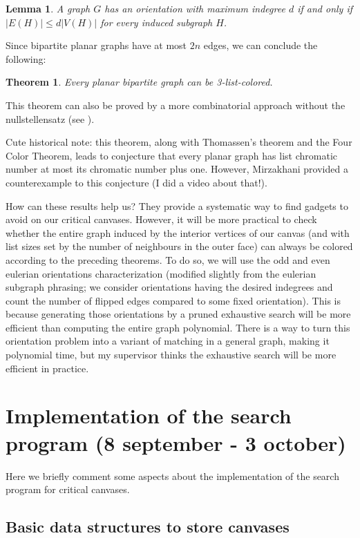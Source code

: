 \documentclass{article}
\newtheorem{theorem}{Theorem}
\newtheorem{lemma}{Lemma}
\begin{document}
\begin{lemma}
A graph $G$ has an orientation with maximum indegree $d$ if and only if $|E(H)| \leq d|V(H)|$ for every induced subgraph $H$.
\end{lemma}

Since bipartite planar graphs have at most $2n$ edges, we can conclude the following:

\begin{theorem}
Every planar bipartite graph can be 3-list-colored.
\end{theorem}

This theorem can also be proved by a more combinatorial approach without the nullstellensatz (see \cite{dvoraknullstellensatz}). 

Cute historical note: this theorem, along with Thomassen's theorem and the Four Color Theorem, leads to conjecture that every planar graph has list chromatic number at most its chromatic number plus one. However, Mirzakhani provided a counterexample to this conjecture (I did a video about that!).

How can these results help us? They provide a systematic way to find gadgets to avoid on our critical canvases. However, it will be more practical to check whether the entire graph induced by the interior vertices of our canvas (and with list sizes set by the number of neighbours in the outer face) can always be colored according to the preceding theorems. To do so, we will use the odd and even eulerian orientations characterization (modified slightly from the eulerian subgraph phrasing; we consider orientations having the desired indegrees and count the number of flipped edges compared to some fixed orientation). This is because generating those orientations by a pruned exhaustive search will be more efficient than computing the entire graph polynomial. There is a way to turn this orientation problem into a variant of matching in a general graph, making it polynomial time, but my supervisor thinks the exhaustive search will be more efficient in practice. 

\section{Implementation of the search program (8 september - 3 october)}

Here we briefly comment some aspects about the implementation of the search program for critical canvases.

\subsection{Basic data structures to store canvases}
\end{document}
